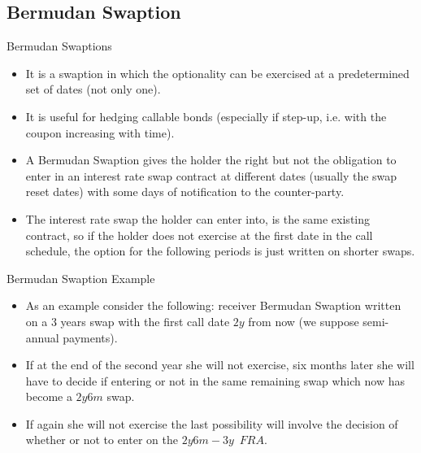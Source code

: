 \documentclass{beamer}
\begin{document}
	\subsection{Bermudan Swaption}
	\begin{frame}{Bermudan Swaptions}
		\begin{itemize}
			\item<1-> It is a swaption in which the optionality can be exercised at a \textcolor{maincolor}{predetermined set of dates} (not only one).
			\item<2-> It is useful for hedging callable bonds (especially if step-up, i.e. with the coupon increasing with time).
			\item<3-> A \textcolor{maincolor}{Bermudan Swaption} gives the holder the right but not the obligation to enter in an interest rate swap contract at different dates (usually the swap reset dates) with some days of notification to the counter-party.
			\item<4-> The interest rate swap the holder can enter into, is the same existing contract, so if the holder does not exercise at the first date in the call schedule, the option for the following periods is just written on shorter swaps.
		\end{itemize}
	\end{frame}

	\begin{frame}{Bermudan Swaption Example}
		\begin{itemize}
			\item<1-> As an example consider the following: receiver Bermudan Swaption written on a 3 years swap with the first call date $2y$ from now (we suppose semi-annual payments).
			\item<2-> If at the end of the second year she will not exercise, six months later she will have to decide if entering or not in the same remaining swap which now has become a $2y6m$ swap.
			\item<3-> If again she will not exercise the last possibility will involve the decision of whether or not to enter on the $2y6m-3y$~$FRA$.
		\end{itemize}
	\end{frame}
\end{document}
